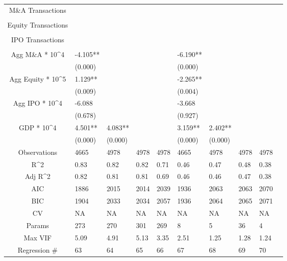 \documentclass{article}
\begin{document}
\begin{table}[H]
\begin{tabular}{|clllllllll|}
  M\&A Transactions &  &  &  &  &  &  &  &  & \\
   &  &  &  &  &  &  &  &  & \\
  Equity Transactions &  &  &  &  &  &  &  &  & \\
   &  &  &  &  &  &  &  &  & \\
  IPO Transactions &  &  &  &  &  &  &  &  & \\
   &  &  &  &  &  &  &  &  & \\
  Agg M\&A * 10^4 & -4.105** &  &  &  & -6.190** &  &  &  & \\
   & (0.000) &  &  &  & (0.000) &  &  &  & \\
  Agg Equity * 10^5 & 1.129** &  &  &  & -2.265** &  &  &  & \\
   & (0.009) &  &  &  & (0.004) &  &  &  & \\
  Agg IPO * 10^4 & -6.088 &  &  &  & -3.668 &  &  &  & \\
   & (0.678) &  &  &  & (0.927) &  &  &  & \\
  GDP * 10^4 & 4.501** & 4.083** &  &  & 3.159** & 2.402** &  &  & \\
   & (0.000) & (0.000) &  &  & (0.000) & (0.000) &  &  & \\
  \hline
 Observations & 4665 & 4978 & 4978 & 4978 & 4665 & 4978 & 4978 & 4978 & \\
  R^2 & 0.83 & 0.82 & 0.82 & 0.71 & 0.46 & 0.47 & 0.48 & 0.38 & \\
  Adj R^2 & 0.82 & 0.81 & 0.81 & 0.69 & 0.46 & 0.46 & 0.47 & 0.38 & \\
  AIC & 1886 & 2015 & 2014 & 2039 & 1936 & 2063 & 2063 & 2070 & \\
  BIC & 1904 & 2033 & 2034 & 2057 & 1936 & 2064 & 2065 & 2071 & \\
  CV & NA & NA & NA & NA & NA & NA & NA & NA & \\
  Params & 273 & 270 & 301 & 269 & 8 & 5 & 36 & 4 & \\
  Max VIF & 5.09 & 4.91 & 5.13 & 3.35 & 2.51 & 1.25 & 1.28 & 1.24 & \\
  Regression \# & 63 & 64 & 65 & 66 & 67 & 68 & 69 & 70 & \\
   \hline
\end{tabular}

\end{table}
\end{document}
